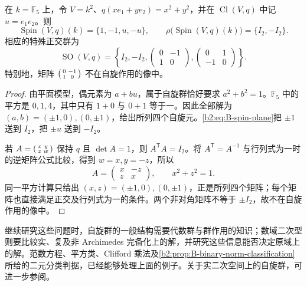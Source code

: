 \begin{proposition}\label{b2:prop:B-finite-spin-image}
	在 \(k=\mathbb F_5\) 上，令 \(V=k^2\)、\(q(xe_1+ye_2)=x^2+y^2\)，并在 \(\operatorname{Cl}(V,q)\) 中记 \(u=e_1e_2\)。则
	\[
		\operatorname{Spin}(V,q)(k)=\{1,-1,u,-u\}, \qquad \rho\bigl(\operatorname{Spin}(V,q)(k)\bigr)=\{I_2,-I_2\}.
	\]
	相应的特殊正交群为
	\[
		\operatorname{SO}(V,q) =\left\{I_2,-I_2,
		\begin{pmatrix}0&-1\\1&0\end{pmatrix},
		\begin{pmatrix}0&1\\-1&0\end{pmatrix}\right\}.
	\]
	特别地，矩阵 \(\begin{psmallmatrix}0&-1\\1&0\end{psmallmatrix}\) 不在自旋作用的像中。
\end{proposition}
\begin{proof}
	由平面模型，偶元素为 \(a+bu\)，属于自旋群恰好要求 \(a^2+b^2=1\)。\(\mathbb F_5\) 中的平方是 \(0,1,4\)，其中只有 \(1+0\) 与 \(0+1\) 等于一。因此全部解为 \((a,b)=(\pm1,0),(0,\pm1)\)，给出所列四个自旋元。\eqref{b2:eq:B-spin-plane}把 \(\pm1\) 送到 \(I_2\)，把 \(\pm u\) 送到 \(-I_2\)。

	若 \(A=\begin{psmallmatrix}x&y\\z&w\end{psmallmatrix}\) 保持 \(q\) 且 \(\det A=1\)，则 \(A^{\mathsf T}A=I_2\)。将 \(A^{\mathsf T}=A^{-1}\) 与行列式为一时的逆矩阵公式比较，得到 \(w=x,y=-z\)，所以
	\[
		A=\begin{pmatrix}x&-z\\z&x\end{pmatrix},\qquad x^2+z^2=1.
	\]
	同一平方计算只给出 \((x,z)=(\pm1,0),(0,\pm1)\)，正是所列四个矩阵；每个矩阵也直接满足正交及行列式为一的条件。两个非对角矩阵不等于 \(\pm I_2\)，故不在自旋作用的像中。
\end{proof}

继续研究这些问题时，自旋群的一般结构需要代数群与群作用的知识；数域二次型则要比较实、复及非 Archimedes 完备化上的解，并研究这些信息能否决定原域上的解。范数方程、平方类、Clifford 乘法及\cref{b2:prop:B-binary-norm-classification}所给的二元分类判据，已经能够处理上面的例子。关于实二次空间上的自旋群，可进一步参阅\cite[Chapter 16]{Porteous1995CliffordClassicalGroups}。
